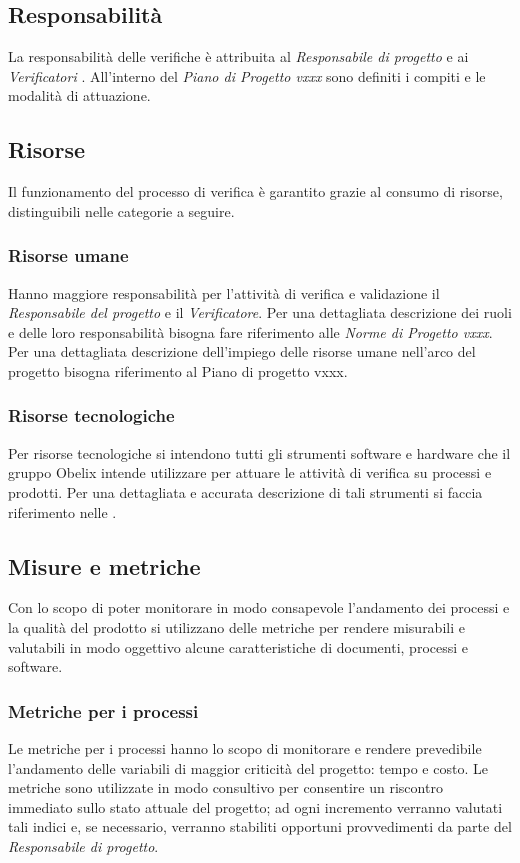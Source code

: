 \subsection{Responsabilità}

La responsabilità delle verifiche è attribuita al  \emph{Responsabile di
  progetto} e ai  \emph{Verificatori} . All'interno del  \emph{Piano
  di Progetto vxxx}  sono definiti i compiti e le modalità di
attuazione.

\subsection{Risorse}
Il funzionamento del processo di verifica è garantito grazie al consumo di risorse, distinguibili
nelle categorie a seguire.
\subsubsection{Risorse umane}

Hanno maggiore responsabilità per l'attività di verifica
e validazione il \emph{Responsabile del progetto} e il
\emph{Verificatore}. Per una dettagliata descrizione dei ruoli e delle
loro responsabilità bisogna fare riferimento alle \emph{Norme di
  Progetto vxxx}. Per una dettagliata descrizione dell'impiego delle
risorse umane nell'arco del progetto bisogna riferimento al Piano di
progetto vxxx.

\subsubsection{Risorse tecnologiche}
Per risorse tecnologiche si intendono
tutti gli strumenti software e hardware che il gruppo Obelix intende
utilizzare per attuare le attività di verifica su processi e
prodotti. Per una dettagliata e accurata descrizione di tali strumenti
si faccia riferimento nelle \emph{\normediprogetto}.



\subsection{Misure e metriche}
Con lo scopo di poter monitorare in modo consapevole l'andamento dei
processi e la qualità del prodotto si utilizzano delle metriche per
rendere misurabili e valutabili in modo oggettivo alcune
caratteristiche di documenti, processi e software.


\subsubsection{Metriche per i processi}
Le metriche per i processi hanno lo scopo  di monitorare e rendere
prevedibile l'andamento delle variabili di maggior criticità del
progetto: tempo e costo. Le metriche sono utilizzate in modo consultivo
per consentire un riscontro immediato sullo stato attuale del
progetto; ad ogni incremento verranno valutati tali indici e, se
necessario, verranno stabiliti opportuni provvedimenti da parte del  \emph{Responsabile di progetto}.

